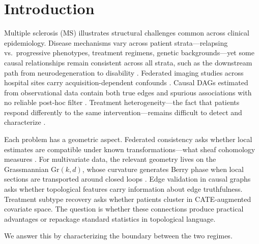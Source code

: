 \documentclass{article}
\newcommand{\Gr}{\mathrm{Gr}}
\begin{document}
\section{Introduction}
\label{sec:intro}

Multiple sclerosis (MS) illustrates structural challenges common across clinical epidemiology.
Disease mechanisms vary across patient strata---relapsing vs.\ progressive phenotypes, treatment regimens, genetic backgrounds---yet some causal relationships remain consistent across all strata, such as the downstream path from neurodegeneration to disability \citep{lublin2014defining}.
Federated imaging studies across hospital sites carry acquisition-dependent confounds \citep{fortin2018harmonization}.
Causal DAGs estimated from observational data contain both true edges and spurious associations with no reliable post-hoc filter \citep{glymour2019review}.
Treatment heterogeneity---the fact that patients respond differently to the same intervention---remains difficult to detect and characterize \citep{athey2016recursive}.

Each problem has a geometric aspect.
Federated consistency asks whether local estimates are compatible under known transformations---what sheaf cohomology measures \citep{robinson2014topological, curry2014sheaves}.
For multivariate data, the relevant geometry lives on the Grassmannian $\Gr(k,d)$, whose curvature generates Berry phase when local sections are transported around closed loops \citep{berry1984quantal, simon1983holonomy}.
Edge validation in causal graphs asks whether topological features carry information about edge truthfulness.
Treatment subtype recovery asks whether patients cluster in CATE-augmented covariate space.
The question is whether these connections produce practical advantages or repackage standard statistics in topological language.

We answer this by characterizing the boundary between the two regimes.
\end{document}
